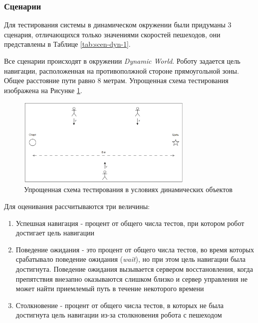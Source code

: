 \subsubsection{Сценарии}

Для тестирования системы в динамическом окружении были придуманы 3 сценария, отличающихся только значениями скоростей пешеходов, они представлены в Таблице \ref*{tab:scen-dyn-1}.

Все сценарии происходят в окружении \textit{Dynamic World}. Роботу задается цель навигации, расположенная на противополжной стороне прямоугольной зоны. Общее расстояние пути равно $8$ метрам. Упрощенная схема тестирования изображена на Рисунке \ref*{fig:test-scheme}. \\

\begin{figure}[H]
    \centering
    \includegraphics[width=0.75\textwidth]{images/chap_4/test-scheme.png}
    \caption{Упрощенная схема тестирования в условиях динамических объектов}
    \label{fig:test-scheme}
\end{figure}

Для оценивания рассчитываются три величины: 
\begin{enumerate}
    \item Успешная навигация - процент от общего числа тестов, при котором робот достигает цель навигации
    \item Поведение ожидания - это процент от общего числа тестов, во время которых срабатывало поведение ожидания (\textit{wait}), но при этом цель навигации была достигнута. Поведение ожидания вызывается сервером восстановления, когда препятствия внезапно оказываются слишком близко и сервер управления не может найти приемлемый путь в течение некоторого времени
    \item Столкновение - процент от общего числа тестов, в которых не была достигнута цель навигации из-за столкновения робота с пешеходом

\end{enumerate}

